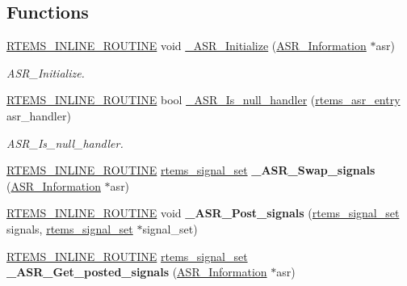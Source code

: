 \subsection*{Functions}
\begin{DoxyCompactItemize}
\item 
\mbox{\hyperlink{group__RTEMSScoreBaseDefs_gac216239df231d5dbd15e3520b0b9313f}{R\+T\+E\+M\+S\+\_\+\+I\+N\+L\+I\+N\+E\+\_\+\+R\+O\+U\+T\+I\+NE}} void \mbox{\hyperlink{group__ClassicASRImpl_gaa7563d887742cc52b9f280bbd91f4aef}{\+\_\+\+A\+S\+R\+\_\+\+Initialize}} (\mbox{\hyperlink{structASR__Information}{A\+S\+R\+\_\+\+Information}} $\ast$asr)
\begin{DoxyCompactList}\small\item\em A\+S\+R\+\_\+\+Initialize. \end{DoxyCompactList}\item 
\mbox{\hyperlink{group__RTEMSScoreBaseDefs_gac216239df231d5dbd15e3520b0b9313f}{R\+T\+E\+M\+S\+\_\+\+I\+N\+L\+I\+N\+E\+\_\+\+R\+O\+U\+T\+I\+NE}} bool \mbox{\hyperlink{group__ClassicASRImpl_ga719294d46adff2cf48f70292977f1546}{\+\_\+\+A\+S\+R\+\_\+\+Is\+\_\+null\+\_\+handler}} (\mbox{\hyperlink{group__ClassicASR_ga7277136adc52f70cdfd49c687ce37732}{rtems\+\_\+asr\+\_\+entry}} asr\+\_\+handler)
\begin{DoxyCompactList}\small\item\em A\+S\+R\+\_\+\+Is\+\_\+null\+\_\+handler. \end{DoxyCompactList}\item 
\mbox{\label{group__ClassicASRImpl_ga496c903f7e707c3ca892247473ed57bd}} 
\mbox{\hyperlink{group__RTEMSScoreBaseDefs_gac216239df231d5dbd15e3520b0b9313f}{R\+T\+E\+M\+S\+\_\+\+I\+N\+L\+I\+N\+E\+\_\+\+R\+O\+U\+T\+I\+NE}} \mbox{\hyperlink{group__ClassicASR_gae494c868e6d04d19b2f403bb51de98eb}{rtems\+\_\+signal\+\_\+set}} {\bfseries \+\_\+\+A\+S\+R\+\_\+\+Swap\+\_\+signals} (\mbox{\hyperlink{structASR__Information}{A\+S\+R\+\_\+\+Information}} $\ast$asr)
\item 
\mbox{\label{group__ClassicASRImpl_ga7165a0ddb5d9434abfcb841c451842f0}} 
\mbox{\hyperlink{group__RTEMSScoreBaseDefs_gac216239df231d5dbd15e3520b0b9313f}{R\+T\+E\+M\+S\+\_\+\+I\+N\+L\+I\+N\+E\+\_\+\+R\+O\+U\+T\+I\+NE}} void {\bfseries \+\_\+\+A\+S\+R\+\_\+\+Post\+\_\+signals} (\mbox{\hyperlink{group__ClassicASR_gae494c868e6d04d19b2f403bb51de98eb}{rtems\+\_\+signal\+\_\+set}} signals, \mbox{\hyperlink{group__ClassicASR_gae494c868e6d04d19b2f403bb51de98eb}{rtems\+\_\+signal\+\_\+set}} $\ast$signal\+\_\+set)
\item 
\mbox{\label{group__ClassicASRImpl_ga4d8d2ce253def38c19cb128b29bf0025}} 
\mbox{\hyperlink{group__RTEMSScoreBaseDefs_gac216239df231d5dbd15e3520b0b9313f}{R\+T\+E\+M\+S\+\_\+\+I\+N\+L\+I\+N\+E\+\_\+\+R\+O\+U\+T\+I\+NE}} \mbox{\hyperlink{group__ClassicASR_gae494c868e6d04d19b2f403bb51de98eb}{rtems\+\_\+signal\+\_\+set}} {\bfseries \+\_\+\+A\+S\+R\+\_\+\+Get\+\_\+posted\+\_\+signals} (\mbox{\hyperlink{structASR__Information}{A\+S\+R\+\_\+\+Information}} $\ast$asr)
\end{DoxyCompactItemize}



